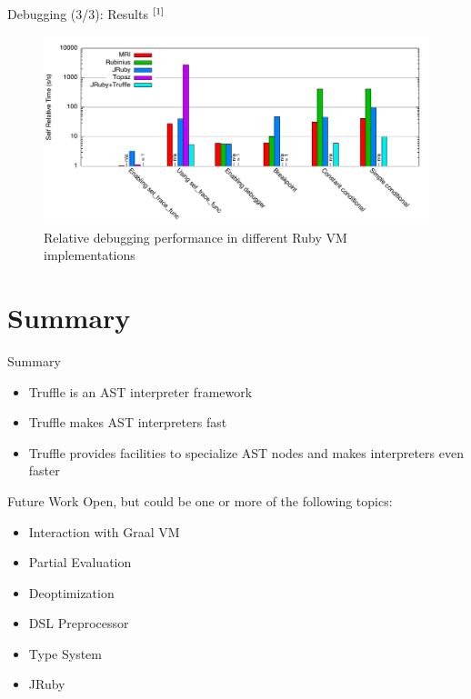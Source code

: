 \documentclass[xcolor=dvipsname,handout]{beamer}
\newcommand{\up}[1]{\ensuremath{^{{\tiny#1}}}}
\begin{document}
\begin{frame}{Debugging (3/3): Results \up{[1]}}
  \begin{figure}
    \includegraphics[width=\textwidth]{performance-debugging.pdf}
    \caption{Relative debugging performance in different Ruby VM implementations}
    \label{fig:debuggin_performance}
  \end{figure}
\end{frame}


\section{Summary}

\begin{frame}{Summary}
  \begin{itemize}
    \item Truffle is an AST interpreter framework
    \item Truffle makes AST interpreters fast
    \item Truffle provides facilities to specialize AST nodes and makes interpreters even faster
  \end{itemize}
\end{frame}

\begin{frame}{Future Work}
    Open, but could be one or more of the following topics:
    \begin{itemize}
        \item Interaction with Graal VM
        \item Partial Evaluation
        \item Deoptimization
        \item DSL Preprocessor
        \item Type System
        \item JRuby
    \end{itemize}
\end{frame}
\end{document}
